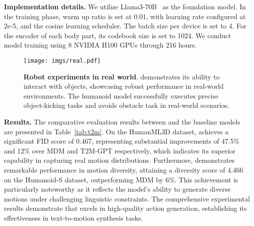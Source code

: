 \textbf{Implementation details.}
We utilize Llama3-70B~\cite{dubey2024llama} as the foundation model. In the training phase, warm up ratio is set at 0.01, with learning rate configured at 2e-5, and the cosine learning scheduler. The batch size per device is set to 4. For the encoder of each body part, its codebook size is set to 1024. We conduct model training using 8 NVIDIA H100 GPUs through {216} hours.


\begin{figure*}[t]
  \centering
   \texttt{[image: imgs/real.pdf]}
   \caption{\textbf{Robot experiments in real world}. \modelname demonstrates its ability to interact with objects, showcasing robust performance in real-world environments. The humanoid model successfully executes precise object-kicking tasks and avoids obstacle task in real-world scenarios.}
   \label{fig:real}
   \vspace{-1.5em}
\end{figure*}





\textbf{Results.}
The comparative evaluation results between \modelname and the baseline models are presented in Table~\ref{tab:t2m}. On the HumanML3D dataset, \modelname achieves a significant FID score of 0.467, representing substantial improvements of 47.5\% and 12\% over MDM and T2M-GPT respectively, which indicates its superior capability in capturing real motion distributions. Furthermore, \modelname demonstrates remarkable performance in motion diversity, attaining a diversity score of 4.466 on the Humanoid-S dataset, outperforming MDM by 6\%. This achievement is particularly noteworthy as it reflects the model's ability to generate diverse motions under challenging linguistic constraints. The comprehensive experimental results demonstrate that \modelname excels in high-quality action generation, establishing its effectiveness in text-to-motion synthesis tasks.


